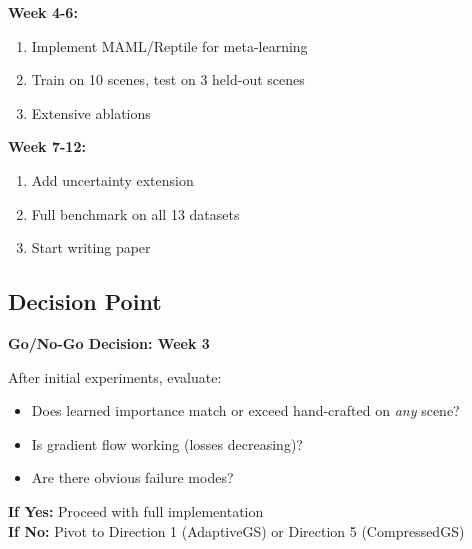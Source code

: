 \documentclass[11pt,letterpaper]{article}
\begin{document}
\textbf{Week 4-6:}
\begin{enumerate}[leftmargin=*]
    \item Implement MAML/Reptile for meta-learning
    \item Train on 10 scenes, test on 3 held-out scenes
    \item Extensive ablations
\end{enumerate}

\textbf{Week 7-12:}
\begin{enumerate}[leftmargin=*]
    \item Add uncertainty extension
    \item Full benchmark on all 13 datasets
    \item Start writing paper
\end{enumerate}

\subsection{Decision Point}

\textbf{Go/No-Go Decision: Week 3}

After initial experiments, evaluate:
\begin{itemize}[leftmargin=*]
    \item Does learned importance match or exceed hand-crafted on \textit{any} scene?
    \item Is gradient flow working (losses decreasing)?
    \item Are there obvious failure modes?
\end{itemize}

\textbf{If Yes:} Proceed with full implementation \\
\textbf{If No:} Pivot to Direction 1 (AdaptiveGS) or Direction 5 (CompressedGS)

\end{document}
